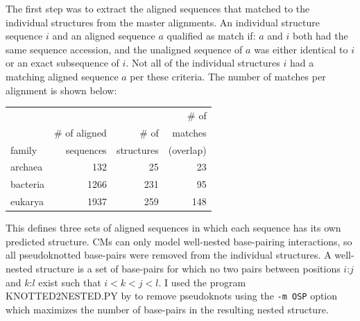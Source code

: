 The first step was to extract the aligned sequences that matched to
the individual structures from the master alignments.  An individual
structure sequence $i$ and an aligned sequence $a$ qualified as match
if: $a$ and $i$ both had the same sequence accession, and the
unaligned sequence of $a$ was either identical to $i$ or an exact
subsequence of $i$.  Not all of the individual structures $i$ had a
matching aligned sequence $a$ per these criteria.  The number of
matches per alignment is shown below:

\begin{center}
\begin{tabular}{l|r|r|r}
             &               &            & \# of   \\ 
             & \# of aligned & \# of      & matches  \\ 
family       & sequences     & structures & (overlap) \\ \hline%
archaea      &           132 &         25 &  23      \\%
bacteria     &          1266 &        231 &  95      \\%
eukarya      &          1937 &        259 & 148      \\%
\end{tabular}
\end{center}

This defines three sets of aligned sequences in which each sequence 
has its own predicted structure. CMs can only model well-nested
base-pairing interactions, so all pseudoknotted base-pairs
were removed from the individual structures. A well-nested structure
is a set of base-pairs for which no two pairs between positions $i$:$j$
and $k$:$l$ exist such that $i<k<j<l$. I used the program
KNOTTED2NESTED.PY by \cite{Smit08} to remove
pseudoknots using the \texttt{-m OSP} option which maximizes the number
of base-pairs in the resulting nested structure.

